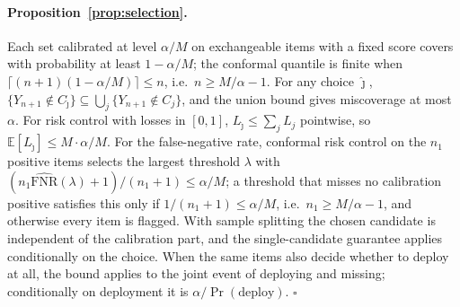 \paragraph{Proposition~\ref{prop:selection}.}
Each set calibrated at level $\alpha/M$ on exchangeable items with a fixed score covers with probability at least
$1 - \alpha/M$; the conformal quantile is finite when $\lceil (n+1)(1 - \alpha/M) \rceil \le n$, i.e.\
$n \ge M/\alpha - 1$. For any choice $\hat\jmath$, $\{Y_{n+1} \notin C_{\hat\jmath}\} \subseteq \bigcup_j \{Y_{n+1}
\notin C_j\}$, and the union bound gives miscoverage at most $\alpha$. For risk control with losses in $[0, 1]$,
$L_{\hat\jmath} \le \sum_j L_j$ pointwise, so $\mathbb{E}[L_{\hat\jmath}] \le M \cdot \alpha/M$. For the false-negative
rate, conformal risk control on the $n_1$ positive items selects the largest threshold $\lambda$ with
$(n_1 \widehat{\mathrm{FNR}}(\lambda) + 1)/(n_1 + 1) \le \alpha/M$; a threshold that misses no calibration positive
satisfies this only if $1/(n_1 + 1) \le \alpha/M$, i.e.\ $n_1 \ge M/\alpha - 1$, and otherwise every item is flagged.
With sample splitting the chosen candidate is independent of the calibration part, and the single-candidate guarantee
applies conditionally on the choice. When the same items also decide whether to deploy at all, the bound applies to the
joint event of deploying and missing; conditionally on deployment it is $\alpha / \Pr(\text{deploy})$. $\square$

